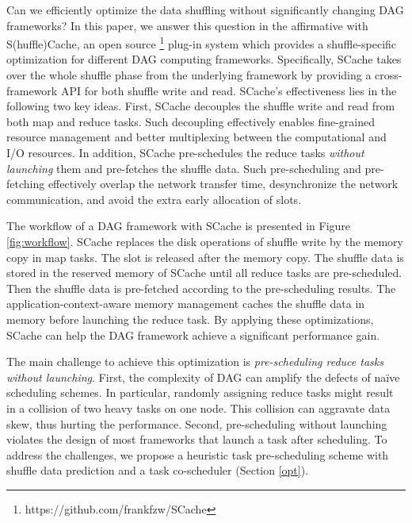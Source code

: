 Can we efficiently optimize the data shuffling without significantly changing DAG frameworks?
In this paper, we answer this question in the affirmative with S(huffle)Cache, an open source \footnote{https://github.com/frankfzw/SCache} plug-in system which provides a shuffle-specific optimization for different DAG computing frameworks.
Specifically, SCache takes over the whole shuffle phase from the underlying framework by providing a cross-framework API for both shuffle write and read.
SCache's effectiveness lies in the following two key ideas.
First, SCache decouples the shuffle write and read from both map and reduce tasks.
\ifrevision
{}
\fi
Such decoupling effectively enables fine-grained resource management and better multiplexing between the computational and I/O resources.
In addition, SCache pre-schedules the reduce tasks \emph{without launching} them and pre-fetches the shuffle data. 
Such pre-scheduling and pre-fetching effectively overlap the network transfer time, desynchronize the network communication, 
and avoid the extra early allocation of slots.

The workflow of a DAG framework with SCache is presented in Figure \ref{fig:workflow}. 
SCache replaces the disk operations of shuffle write by the memory copy in map tasks. 
The slot is released after the memory copy. 
The shuffle data is stored in the reserved memory of SCache until all reduce tasks are pre-scheduled. 
Then the shuffle data is pre-fetched according to the pre-scheduling results.  
The application-context-aware memory management caches the shuffle data in memory before launching the reduce task.
By applying these optimizations, SCache can help the DAG framework achieve a significant performance gain.  

The main challenge to achieve this optimization is \textit{pre-scheduling reduce tasks without launching}. 
First, the complexity of DAG can amplify the defects of na\"{i}ve scheduling schemes. 
In particular, randomly assigning reduce tasks might result in a collision of two heavy tasks on one node. 
This collision can aggravate data skew, thus hurting the performance. 
Second, pre-scheduling without launching violates the design of most frameworks that launch a task after scheduling.
To address the challenges, we propose a heuristic task pre-scheduling scheme with shuffle data prediction and a task co-scheduler (Section \ref{opt}).

